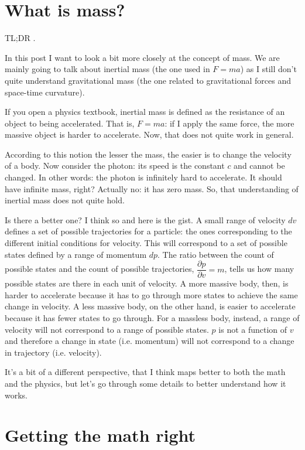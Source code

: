 \documentclass[aps,pra,10pt,floatfix,nofootinbib]{revtex4-1}
\theoremstyle{definition}
\begin{document}
	
\section{What is mass?}

TL;DR .

In this post I want to look a bit more closely at the concept of mass. We are mainly going to talk about inertial mass (the one used in $F=ma$) as I still don't quite understand gravitational mass (the one related to gravitational forces and space-time curvature).

If you open a physics textbook, inertial mass is defined as the resistance of an object to being accelerated. That is, $F=ma$: if I apply the same force, the more massive object is harder to accelerate. Now, that does not quite work in general.

According to this notion the lesser the mass, the easier is to change the velocity of a body. Now consider the photon: its speed is the constant $c$ and cannot be changed. In other words: the photon is infinitely hard to accelerate. It should have infinite mass, right? Actually no: it has zero mass. So, that understanding of inertial mass does not quite hold.

Is there a better one? I think so and here is the gist. A small range of velocity $dv$ defines a set of possible trajectories for a particle: the ones corresponding to the different initial conditions for velocity. This will correspond to a set of possible states defined by a range of momentum $dp$. The ratio between the count of possible states and the count of possible trajectories, $\dfrac{\partial p}{\partial v} = m$, tells us how many possible states are there in each unit of velocity. A more massive body, then, is harder to accelerate because it has to go through more states to achieve the same change in velocity. A less massive body, on the other hand, is easier to accelerate because it has fewer states to go through. For a massless body, instead, a range of velocity will not correspond to a range of possible states. $p$ is not a function of $v$ and therefore a change in state (i.e. momentum) will not correspond to a change in trajectory (i.e. velocity).

It's a bit of a different perspective, that I think maps better to both the math and the physics, but let's go through some details to better understand how it works.

\section{Getting the math right}
\end{document}
